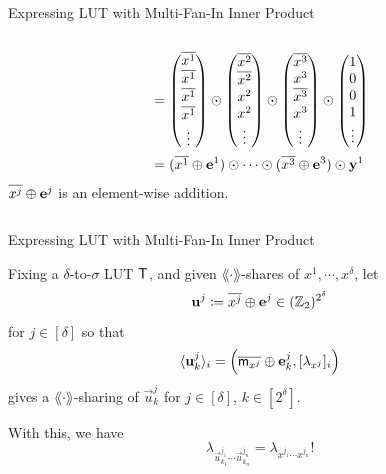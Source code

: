 \documentclass[../240906_cryptlab_flute.tex]{subfiles}
\begin{document}
\begin{frame}{Expressing LUT with Multi-Fan-In Inner Product}
\begin{columns}
\begin{column}{.5\textwidth}
\begin{align*}
                &= \begin{pmatrix} \overline{x^1} \\ \overline{x^1} \\ \overline{x^1} \\ \overline{x^1} \\ \vdots \end{pmatrix}
                   \odot \begin{pmatrix} \overline{x^2} \\ \overline{x^2} \\ x^2 \\ x^2 \\ \vdots \end{pmatrix}
                   \odot \begin{pmatrix} \overline{x^3} \\ x^3 \\ \overline{x^3} \\ x^3 \\ \vdots \end{pmatrix}
                   \odot \begin{pmatrix} 1 \\ 0 \\ 0 \\ 1 \\ \vdots \end{pmatrix} \\
                &= (\overline{x^1} \oplus \boldsymbol{\mathbf{e}}^1) \odot \cdots \odot (\overline{x^3} \oplus \boldsymbol{\mathbf{e}}^3) \odot \boldsymbol{\mathbf{y}}^1
            \end{align*}
            \footnoterule
            \footnotesize
            \(\overline{x^j} \oplus \boldsymbol{\mathbf{e}}^j\) is an element-wise addition.
        \end{column}
    \end{columns}
\end{frame}

\begin{frame}{Expressing LUT with Multi-Fan-In Inner Product}
    \begin{block}{}
    Fixing a \(\delta\)-to-\(\sigma\) LUT \(\mathsf{T}\),
    and given \(\lang\cdot\rang\)-shares of \(x^1, \cdots, x^\delta\),
    let
    \[
        \boldsymbol{\mathbf{u}}^j \coloneqq \overline{x^j} \oplus \boldsymbol{\mathbf{e}}^j \in (\mathbb{Z}_2)^{2^\delta}
    \]
    for \(j \in [\delta]\) so that
    \[
        \langle \boldsymbol{\mathbf{u}}^j_k \rangle_i = \left(\overline{\mathsf{m}_{x^j}} \oplus \boldsymbol{\mathbf{e}}^j_k, [\lambda_{x^j}]_i\right)
    \]
    gives a \(\lang\cdot\rang\)-sharing of \(\vec{u}^j_k\) for \(j \in [\delta]\), \(k \in [2^\delta]\).
    \end{block}
    \pause
    \begin{exampleblock}{}
        With this, we have
        \[
            \lambda_{\vec{u}^{j_1}_{k_1}\cdots\vec{u}^{j_n}_{k_n}}
            = \lambda_{x^{j_1} \cdots x^{j_n}}\text{!}
        \]
    \end{exampleblock}
\end{frame}
\end{document}
